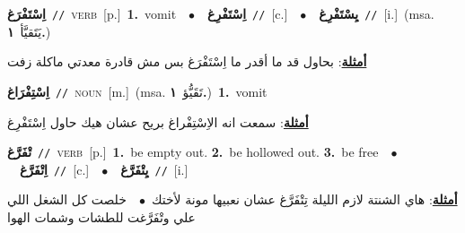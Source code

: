 \documentclass[10pt,a4paper,twoside]{article} %
\begin{document}
\begin{multicols}{2}
{\setlength\topsep{0pt}\textbf{\foreignlanguage{arabic}{اِسْتَفْرَغ}}\ {\color{gray}\texttt{//}\color{black}}\ \textsc{verb}\ [p.]\ \textbf{1.}~vomit\ \ $\bullet$\ \ \setlength\topsep{0pt}\textbf{\foreignlanguage{arabic}{اِسْتَفْرِغ}}\ {\color{gray}\texttt{//}\color{black}}\ [c.]\ \ $\bullet$\ \ \setlength\topsep{0pt}\textbf{\foreignlanguage{arabic}{يِسْتَفْرِغ}}\ {\color{gray}\texttt{//}\color{black}}\ [i.]\ \color{gray}(msa. \foreignlanguage{arabic}{يَتَقيَّأ}~\foreignlanguage{arabic}{\textbf{١.}})\color{black}\  \begin{flushright}\color{gray}\foreignlanguage{arabic}{\textbf{\underline{\foreignlanguage{arabic}{أمثلة}}}: بحاول قد ما أقدر ما اِسْتَفْرَغ بس مش قادرة معدتي ماكلة زفت}\end{flushright}\color{black}} \vspace{2mm}

{\setlength\topsep{0pt}\textbf{\foreignlanguage{arabic}{اِسْتِفْرَاغ}}\ {\color{gray}\texttt{//}\color{black}}\ \textsc{noun}\ [m.]\ \color{gray}(msa. \foreignlanguage{arabic}{تَقَيُّؤ}~\foreignlanguage{arabic}{\textbf{١.}})\color{black}\ \textbf{1.}~vomit\  \begin{flushright}\color{gray}\foreignlanguage{arabic}{\textbf{\underline{\foreignlanguage{arabic}{أمثلة}}}: سمعت انه الاِسْتِفْراغ بريح عشان هيك حاول اِسْتَفْرِغ}\end{flushright}\color{black}} \vspace{2mm}

{\setlength\topsep{0pt}\textbf{\foreignlanguage{arabic}{تْفَرَّغ}}\ {\color{gray}\texttt{//}\color{black}}\ \textsc{verb}\ [p.]\ \textbf{1.}~be empty out.  \textbf{2.}~be hollowed out.  \textbf{3.}~be free\ \ $\bullet$\ \ \setlength\topsep{0pt}\textbf{\foreignlanguage{arabic}{اِتْفَرَّغ}}\ {\color{gray}\texttt{//}\color{black}}\ [c.]\ \ $\bullet$\ \ \setlength\topsep{0pt}\textbf{\foreignlanguage{arabic}{يِتْفَرَّغ}}\ {\color{gray}\texttt{//}\color{black}}\ [i.]\  \begin{flushright}\color{gray}\foreignlanguage{arabic}{\textbf{\underline{\foreignlanguage{arabic}{أمثلة}}}: هاي الشنتة لازم الليلة تِتْفَرَّغ عشان نعبيها مونة لأختك\ $\bullet$\ \  خلصت كل الشغل اللي علي وتْفَرَّغت للطشات وشمات الهوا}\end{flushright}\color{black}} \vspace{2mm}


\end{multicols}
\end{document}
